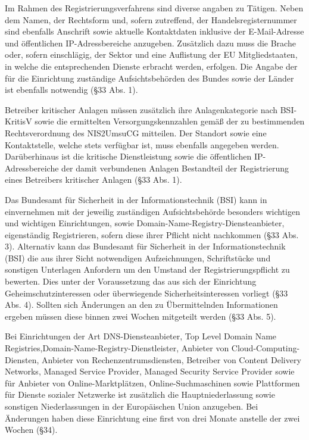 \documentclass[11pt,a4paper]{article}   %
\begin{document}
        Im Rahmen des Registrierungsverfahrens sind diverse angaben zu Tätigen. Neben dem Namen, der Rechtsform und, sofern zutreffend, der Handelsregisternummer sind ebenfalls Anschrift sowie aktuelle Kontaktdaten inklusive der E-Mail-Adresse und öffentlichen IP-Adressbereiche anzugeben. Zusätzlich dazu muss die Brache oder, sofern einschlägig, der Sektor und eine Auflistung der EU Mitgliedstaaten, in welche die entsprechenden Dienste erbracht werden, erfolgen. Die Angabe der für die Einrichtung zuständige Aufsichtsbehörden des Bundes sowie der Länder ist ebenfalls notwendig (§33 Abs. 1). 

        Betreiber kritischer Anlagen müssen zusätzlich ihre Anlagenkategorie nach BSI-KritisV sowie die ermittelten Versorgungskennzahlen gemäß der zu bestimmenden Rechtsverordnung des NIS2UmsuCG mitteilen. Der Standort sowie eine Kontaktstelle, welche stets verfügbar ist, muss ebenfalls angegeben werden. Darüberhinaus ist die kritische Dienstleistung sowie die öffentlichen IP-Adressbereiche der damit verbundenen Anlagen Bestandteil der Registrierung eines Betreibers kritischer Anlagen (§33 Abs. 1).

        Das Bundesamt für Sicherheit in der Informationstechnik (BSI) kann in einvernehmen mit der jeweilig zuständigen Aufsichtsbehörde besonders wichtigen und wichtigen Einrichtungen, sowie Domain-Name-Registry-Diensteanbieter, eigenständig Registrieren, sofern diese ihrer Pflicht nicht nachkommen (§33 Abs. 3). Alternativ kann das Bundesamt für Sicherheit in der Informationstechnik (BSI) die aus ihrer Sicht notwendigen Aufzeichnungen, Schriftstücke und sonstigen Unterlagen Anfordern um den Umstand der Registrierungspflicht zu bewerten. Dies unter der Voraussetzung das aus sich der Einrichtung Geheimschutzinteressen oder überwiegende Sicherheitsinteressen vorliegt (§33 Abs. 4). Sollten sich Änderungen an den zu Übermittelnden Informationen ergeben müssen diese binnen zwei Wochen mitgeteilt werden (§33 Abs. 5).

        Bei Einrichtungen der Art DNS-Diensteanbieter, Top Level Domain Name Registries,Domain-Name-Registry-Dienstleister, Anbieter von Cloud-Computing-Diensten, Anbieter von Rechenzentrumsdiensten, Betreiber von Content Delivery Networks, Managed Service Provider, Managed Security Service Provider sowie für Anbieter von Online-Marktplätzen, Online-Suchmaschinen sowie Plattformen für Dienste sozialer Netzwerke ist zusätzlich die Hauptniederlassung sowie sonstigen Niederlassungen in der Europäischen Union anzugeben. Bei Änderungen haben diese Einrichtung eine first von drei Monate anstelle der zwei Wochen (§34).
\end{document}
